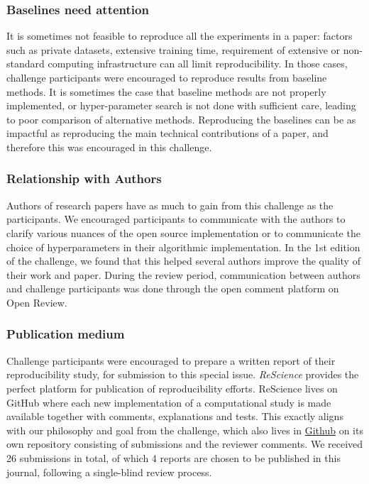 \subsubsection{Baselines need attention} 

It is sometimes not feasible to reproduce all the experiments in a paper: factors such as private datasets, extensive training time, requirement of extensive or non-standard computing infrastructure can all limit reproducibility. In those cases, challenge participants were encouraged to reproduce results from baseline methods.  It is sometimes the case that baseline methods are not properly implemented, or hyper-parameter search is not done with sufficient care, leading to poor comparison of alternative methods. Reproducing the baselines can be as impactful as reproducing the main technical contributions of a paper, and therefore this was encouraged in this challenge.

\subsubsection{Relationship with Authors} 

Authors of research papers have as much to gain from this challenge as the participants. We encouraged participants to communicate with the authors to clarify various nuances of the open source implementation or to communicate the choice of hyperparameters in their algorithmic implementation.  In the 1st edition of the challenge, we found that this helped several authors improve the quality of their work and paper.  During the review period, communication between authors and challenge participants was done through the open comment platform on Open Review.

\subsubsection{Publication medium}

Challenge participants were encouraged to prepare a written report of their reproducibility study, for submission to this special issue.  \textit{ReScience} provides the perfect platform for publication of reproducibility efforts. ReScience lives on GitHub where each new implementation of a computational study is made available together with comments, explanations and tests. This exactly aligns with our philosophy and goal from the challenge, which also lives in \href{https://github.com/reproducibility-challenge/iclr_2019/}{Github} on its own repository consisting of submissions and the reviewer comments.   We received 26 submissions in total, of which 4 reports are chosen to be published in this journal, following a single-blind review process.


